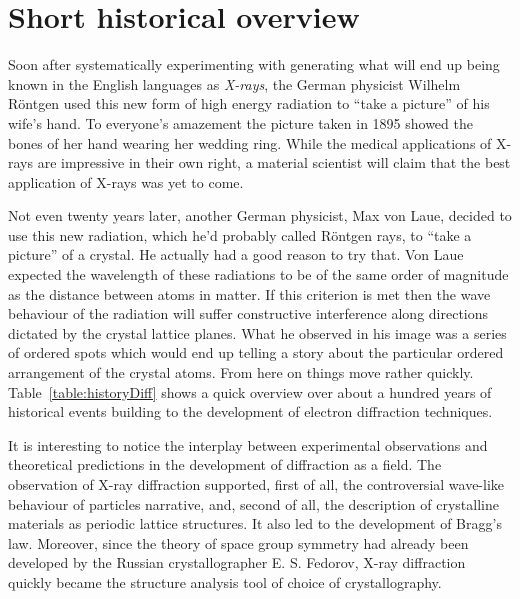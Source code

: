 \chapter{Short historical overview}
\label{sec:history}
Soon after systematically experimenting with generating what will end up being known in the English languages as \textit{X-rays}, the German physicist Wilhelm R{\"o}ntgen used this new form of high energy radiation to ``take a picture'' of his wife’s hand. To everyone’s amazement the picture taken in 1895 showed the bones of her hand wearing her wedding ring. While the medical applications of X-rays are impressive in their own right, a material scientist will claim that the best application of X-rays was yet to come.

Not even twenty years later, another German physicist, Max von Laue, decided to use this new radiation, which he'd probably called R{\"o}ntgen rays,  to ``take a picture'' of a crystal. He actually had a good reason to try that. Von Laue expected the wavelength of these radiations to be of the same order of magnitude as the distance between atoms in matter. If this criterion is met then the wave behaviour of the radiation will suffer constructive interference along directions dictated by the crystal lattice planes. What he observed in his image was a series of ordered spots which would end up telling a story about the particular ordered arrangement of the crystal atoms. From here on things move rather quickly. Table~\ref{table:historyDiff} shows a quick overview over about a hundred years of historical events building to the development of electron diffraction techniques.

It is interesting to notice the interplay between experimental observations and theoretical predictions in the development of diffraction as a field. The observation of X-ray diffraction supported, first of all, the controversial wave-like behaviour of particles narrative, and, second of all, the description of crystalline materials as periodic lattice structures. It also led to the development of Bragg's law. Moreover, since the theory of space group symmetry had already been developed by the Russian crystallographer E. S. Fedorov, X-ray diffraction quickly became the structure analysis tool of choice of crystallography.








  

\renewcommand{\arraystretch}{1.3}

